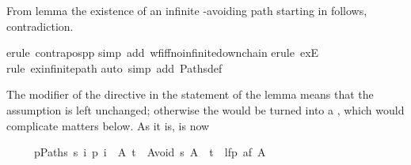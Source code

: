 \begin{isabellebody}
\begin{isamarkuptxt}
\begin{isabelle}
\end{isabelle}
From lemma  the existence of an infinite
-avoiding path starting in  follows, contradiction.%
\end{isamarkuptxt}%
\isamarkuptrue%
\isamarkupfalse%
{}erule\ contrapos{}pp{}\isanewline
{}\isamarkupfalse%
{}simp\ add{}\ wf{}iff{}no{}infinite{}down{}chain{}\isanewline
{}\isamarkupfalse%
{}erule\ exE{}\isanewline
{}\isamarkupfalse%
{}rule\ ex{}infinite{}path{}\isanewline
{}\isamarkupfalse%
{}auto\ simp\ add{}\ Paths{}def{}\isanewline
{}\isamarkupfalse%
%
\endisatagproof
{\isafoldproof}%
%
\isadelimproof
%
\endisadelimproof
%
\begin{isamarkuptext}%
The  modifier of the  directive in the
statement of the lemma means
that the assumption is left unchanged; otherwise the  
would be turned
into a , which would complicate matters below. As it is,
 is now
\begin{isabelle}%
\ \ \ \ \ {}{}p{}Paths\ s{}\ {}i{}\ p\ i\ {}\ A{}\ t\ {}\ Avoid\ s\ A{}\ {}\ t\ {}\ lfp\ {}af\ A{}%

\end{isabelle}
\end{isamarkuptext}
\end{isabellebody}
